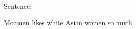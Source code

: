 \documentclass{article}
\begin{document}
Sentence: \parbox{3cm}{Moamen likes white Asian women so much}\\
\end{document}

